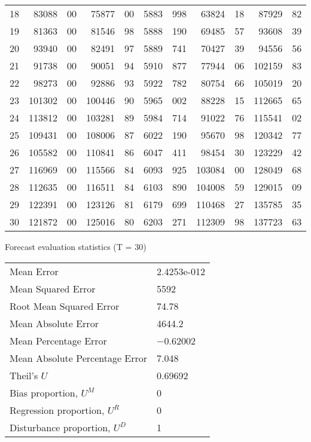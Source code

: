 \documentclass[11pt]{article}
\begin{document}
\begin{center}
\begin{longtable}{%
r%
  r@{.}l%
    r@{.}l%
      r@{.}l%
        r@{.}l%
         r@{.}l}
      18  & 83088&00 & 75877&00 & 5883&998 & 63824&18 & 87929&82 \\
      19  & 81363&00 & 81546&98 & 5888&190 & 69485&57 & 93608&39 \\
      20  & 93940&00 & 82491&97 & 5889&741 & 70427&39 & 94556&56 \\
      21  & 91738&00 & 90051&94 & 5910&877 & 77944&06 & 102159&83 \\
      22  & 98273&00 & 92886&93 & 5922&782 & 80754&66 & 105019&20 \\
      23  & 101302&00 & 100446&90 & 5965&002 & 88228&15 & 112665&65 \\
      24  & 113812&00 & 103281&89 & 5984&714 & 91022&76 & 115541&02 \\
      25  & 109431&00 & 108006&87 & 6022&190 & 95670&98 & 120342&77 \\
      26  & 105582&00 & 110841&86 & 6047&411 & 98454&30 & 123229&42 \\
      27  & 116969&00 & 115566&84 & 6093&925 & 103084&00 & 128049&68 \\
      28  & 112635&00 & 116511&84 & 6103&890 & 104008&59 & 129015&09 \\
      29  & 122391&00 & 123126&81 & 6179&699 & 110468&27 & 135785&35 \\
      30  & 121872&00 & 125016&80 & 6203&271 & 112309&98 & 137723&63 \\
\end{longtable}

Forecast evaluation statistics (T = 30)\\[1ex]

\begin{tabular}{ll}
Mean Error & 2.4253e-012 \\
Mean Squared Error & 5592 \\
Root Mean Squared Error & 74.78 \\
Mean Absolute Error & 4644.2 \\
Mean Percentage Error & $-$0.62002 \\
Mean Absolute Percentage Error & 7.048 \\
Theil's $U$ & 0.69692 \\
Bias proportion, $U^M$ & 0 \\
Regression proportion, $U^R$ & 0 \\
Disturbance proportion, $U^D$ & 1 \\
\end{tabular}
\end{center}
\end{document}
